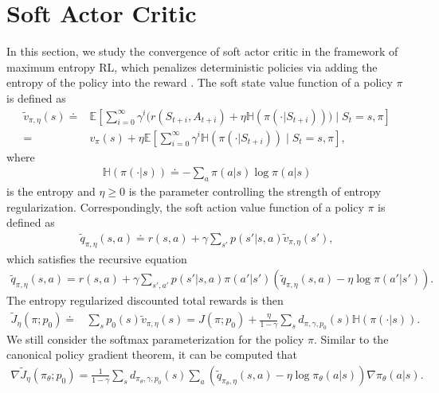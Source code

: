 \documentclass[twoside,11pt]{article}
\newcommand{\E}{\mathbb{E}}
\newcommand{\ent}[1]{\mathbb{H}\left(#1\right)}
\numberwithin{assucounter}{section}
\begin{document}
\section{Soft Actor Critic}
\label{sec sac}
In this section,
we study the convergence of soft actor critic in the framework of maximum entropy RL,
which penalizes deterministic policies via adding the entropy of the policy into the reward \citep{williams1991function,mnih2016asynchronous,nachum2017bridging,haarnoja2018soft}.
The soft state value function of a policy $\pi$ is defined as
\begin{align}
  \tilde v_{\pi, \eta}(s) \doteq& \E\left[\sum_{i=0}^\infty \gamma^{i} \Big(r(S_{t+i}, A_{t+i}) + \eta \ent{\pi(\cdot | S_{t+i})}  \Big) \mid S_t = s, \pi\right] \\
  =& v_\pi(s) + \eta \E\left[\sum_{i=0}^\infty \gamma^{i}  \ent{\pi(\cdot | S_{t+i})} \mid S_t = s, \pi\right],
\end{align}
where
\begin{align}
  \ent{\pi(\cdot | s)} \doteq -\sum_a \pi(a|s) \log \pi(a|s)
\end{align}
is the entropy and $\eta \geq 0$ is the parameter controlling the strength of entropy regularization.
Correspondingly,
the soft action value function of a policy $\pi$ is defined as
\begin{align}
  \label{eq definition of soft q}
  \tilde q_{\pi, \eta}(s, a) \doteq r(s, a) + \gamma \sum_{s'} p(s'|s, a) \tilde v_{\pi, \eta}(s'),
\end{align}
which satisfies the recursive equation
\begin{align}
  \tilde q_{\pi,\eta}(s, a) = r(s, a) + \gamma \sum_{s', a'} p(s' | s, a) \pi(a'|s') \left(\tilde q_{\pi, \eta}(s, a) - \eta \log \pi(a'|s')\right).
\end{align}
The entropy regularized discounted total rewards is then
\begin{align}
  \label{eq relationship J tilde J}
  \tilde J_\eta(\pi; p_0) \doteq& \sum_s p_0(s) \tilde v_{\pi, \eta}(s) = J(\pi; p_0) + \frac{\eta}{1-\gamma} \sum_s d_{\pi, \gamma, p_0}(s) \ent{\pi(\cdot | s)}.
\end{align}
We still consider the softmax parameterization for the policy $\pi$.
Similar to the canonical policy gradient theorem,
it can be computed \citep{levine2018reinforcement} that
\begin{align}
  \nabla \tilde J_\eta(\pi_\theta; p_0) = \frac{1}{1-\gamma} \sum_s d_{\pi_\theta, \gamma, p_0}(s)  \sum_a \left(\tilde q_{\pi_\theta, \eta}(s, a) - \eta \log \pi_\theta(a|s) \right) \nabla \pi_\theta(a|s).
\end{align}
\end{document}
